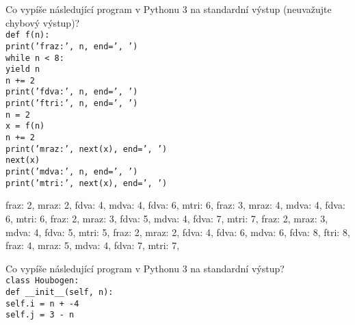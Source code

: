 \documentclass[addpoints,12pt]{exam}
\begin{document}
\begin{questions}
\nopagebreak
\makeemptybox{10cm}
\question[2]
Co vypíše následující program v Pythonu 3 na standardní výstup (neuvažujte chybový výstup)?\\
\texttt{def f(n):\\
\hspace*{0.6cm}print('fraz:', n, end=', ')\\
\hspace*{0.6cm}while n \textless{} 8:\\
\hspace*{0.6cm}\hspace*{0.6cm}yield n\\
\hspace*{0.6cm}\hspace*{0.6cm}n += 2\\
\hspace*{0.6cm}\hspace*{0.6cm}print('fdva:', n, end=', ')\\
\hspace*{0.6cm}print('ftri:', n, end=', ')\\
n = 2\\
x = f(n)\\
n += 2\\
print('mraz:', next(x), end=', ')\\
next(x)\\
print('mdva:', n, end=', ')\\
print('mtri:', next(x), end=', ')}
\nopagebreak
\begin{choices}
\choice
fraz: 2, mraz: 2, fdva: 4, mdva: 4, fdva: 6, mtri: 6,
\choice
fraz: 3, mraz: 4, mdva: 4, fdva: 6, mtri: 6,
\choice
fraz: 2, mraz: 3, fdva: 5, mdva: 4, fdva: 7, mtri: 7,
\choice
fraz: 2, mraz: 3, mdva: 4, fdva: 5, mtri: 5,
\choice
fraz: 2, mraz: 2, fdva: 4, fdva: 6, mdva: 6, fdva: 8, ftri: 8,
\choice
fraz: 4, mraz: 5, mdva: 4, fdva: 7, mtri: 7,
\end{choices}
\question[2]
Co vypíše následující program v Pythonu 3 na standardní výstup?\\
\texttt{class Houbogen:\\
\hspace*{0.6cm}def \_{}\_{}init\_{}\_{}(self, n):\\
\hspace*{0.6cm}\hspace*{0.6cm}self.i = n + -4\\
\hspace*{0.6cm}\hspace*{0.6cm}self.j = 3 - n\\
}
\end{questions}
\end{document}
